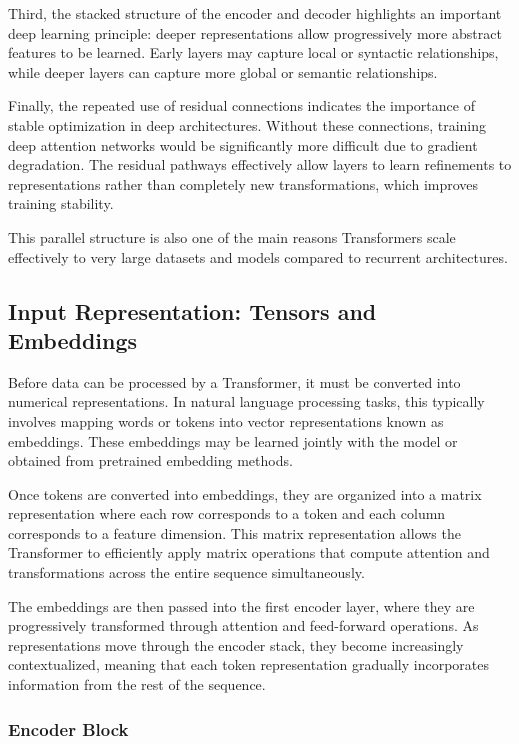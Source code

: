 \documentclass[11pt]{article}
\begin{document}
Third, the stacked structure of the encoder and decoder highlights an important deep learning principle: deeper representations allow progressively more abstract features to be learned. Early layers may capture local or syntactic relationships, while deeper layers can capture more global or semantic relationships.

Finally, the repeated use of residual connections indicates the importance of stable optimization in deep architectures. Without these connections, training deep attention networks would be significantly more difficult due to gradient degradation. The residual pathways effectively allow layers to learn refinements to representations rather than completely new transformations, which improves training stability.

This parallel structure is also one of the main reasons Transformers scale effectively to very large datasets and models compared to recurrent architectures.

\subsection{Input Representation: Tensors and Embeddings}

Before data can be processed by a Transformer, it must be converted into numerical representations. In natural language processing tasks, this typically involves mapping words or tokens into vector representations known as embeddings. These embeddings may be learned jointly with the model or obtained from pretrained embedding methods.

Once tokens are converted into embeddings, they are organized into a matrix representation where each row corresponds to a token and each column corresponds to a feature dimension. This matrix representation allows the Transformer to efficiently apply matrix operations that compute attention and transformations across the entire sequence simultaneously.

The embeddings are then passed into the first encoder layer, where they are progressively transformed through attention and feed-forward operations. As representations move through the encoder stack, they become increasingly contextualized, meaning that each token representation gradually incorporates information from the rest of the sequence.

\subsubsection{Encoder Block}
\end{document}

